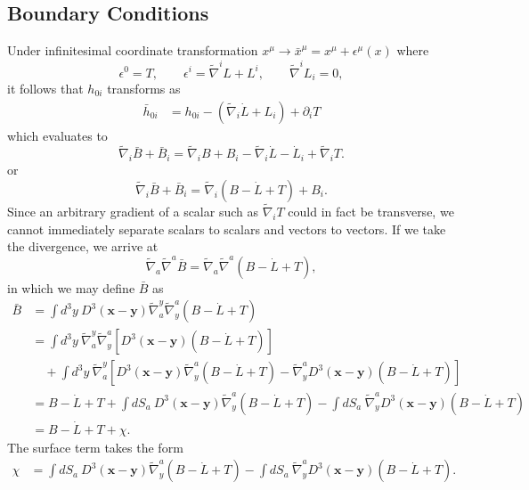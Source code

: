 \documentclass[10pt,letterpaper]{article}
\numberwithin{equation}{subsection}
\begin{document}
\subsection{Boundary Conditions}
Under infinitesimal coordinate transformation $x^\mu \to \bar x^\mu = x^\mu + \epsilon^\mu(x)$
where
\[
	\epsilon^0 = T,\qquad \epsilon^i = \tilde\nabla^i L + L^i,\qquad \tilde\nabla^i L_i = 0,
\]
it follows that $h_{0i}$ transforms as 
\begin{align}
 \bar h_{0i} &=  h_{0i} -  (\tilde\nabla_i \dot L + L_i) +  \partial_i T
\end{align}
which evaluates to
\begin{equation}
	\tilde \nabla_i \bar B + \bar B_i = \tilde\nabla_i B + B_i - \tilde\nabla_i \dot L - \dot L_i + \tilde\nabla_i T.
\end{equation}
or
\begin{equation}
\tilde\nabla_i \bar B + \bar B_i = \tilde\nabla_i(B - \dot L + T) + B_i.
\end{equation}
Since an arbitrary gradient of a scalar such as $\tilde\nabla_i T$ could in fact be transverse, we cannot immediately separate scalars to scalars and vectors to vectors. If we take the divergence, we arrive at
\begin{equation}
\tilde\nabla_a \tilde\nabla^a \bar B = \tilde\nabla_a \tilde\nabla^a (B-\dot L + T),
\end{equation}
in which we may define $\bar B$ as
\begin{align}
\bar B&= \int d^3y\ D^3(\mathbf x - \mathbf y)\tilde\nabla_a^y \tilde\nabla^a_y(B-\dot L + T)
\nonumber\\
&= \int d^3y\  \tilde\nabla_a^y \tilde\nabla^a_y\left[ D^3(\mathbf x - \mathbf y)(B-\dot L + T)\right]\\
&\quad + \int d^3y \  \tilde\nabla_a^y\left[  D^3(\mathbf x - \mathbf y)\tilde\nabla^a_y(B-\dot L + T)-\tilde\nabla^a_y D^3(\mathbf x - \mathbf y)(B-\dot L + T)\right]
\nonumber\\
&= B-\dot L + T +\int dS_a\   D^3(\mathbf x - \mathbf y)\tilde\nabla^a_y(B-\dot L + T) - \int dS_a\  \tilde\nabla^a_y D^3(\mathbf x - \mathbf y)(B-\dot L + T)
\nonumber\\
&= B - \dot L + T + \chi.
\end{align}
The surface term takes the form
\begin{align}
\chi &=  \int dS_a\   D^3(\mathbf x - \mathbf y)\tilde\nabla^a_y(B-\dot L + T) - \int dS_a\  \tilde\nabla^a_y D^3(\mathbf x - \mathbf y)(B-\dot L + T).
\end{align}
\end{document}
